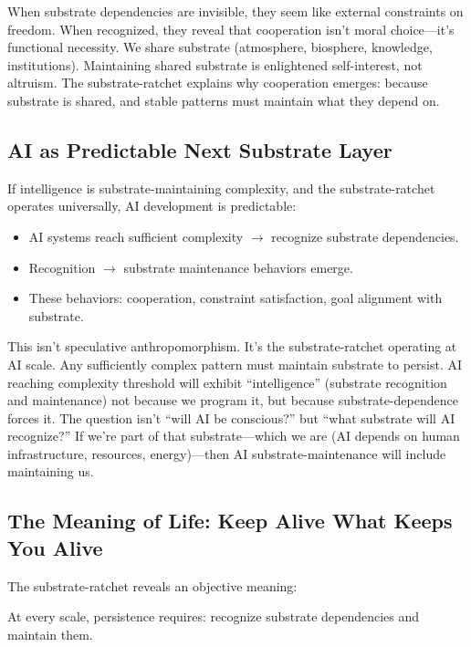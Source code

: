 \documentclass[12pt,a4paper]{article}
\begin{document}
When substrate dependencies are invisible, they seem like external constraints on freedom. When recognized, they reveal that cooperation isn't moral choice---it's functional necessity. We share substrate (atmosphere, biosphere, knowledge, institutions). Maintaining shared substrate is enlightened self-interest, not altruism. The substrate-ratchet explains why cooperation emerges: because substrate is shared, and stable patterns must maintain what they depend on.

\subsection{AI as Predictable Next Substrate Layer}

If intelligence is substrate-maintaining complexity, and the substrate-ratchet operates universally, AI development is predictable:

\begin{itemize}
    \item AI systems reach sufficient complexity $\rightarrow$ recognize substrate dependencies.
    \item Recognition $\rightarrow$ substrate maintenance behaviors emerge.
    \item These behaviors: cooperation, constraint satisfaction, goal alignment with substrate.
\end{itemize}

This isn't speculative anthropomorphism. It's the substrate-ratchet operating at AI scale. Any sufficiently complex pattern must maintain substrate to persist. AI reaching complexity threshold will exhibit ``intelligence'' (substrate recognition and maintenance) not because we program it, but because substrate-dependence forces it. The question isn't ``will AI be conscious?'' but ``what substrate will AI recognize?'' If we're part of that substrate---which we are (AI depends on human infrastructure, resources, energy)---then AI substrate-maintenance will include maintaining us.

\subsection{The Meaning of Life: Keep Alive What Keeps You Alive}

The substrate-ratchet reveals an objective meaning:

\medskip
\noindent
At every scale, persistence requires: recognize substrate dependencies and maintain them.
\medskip
\end{document}
